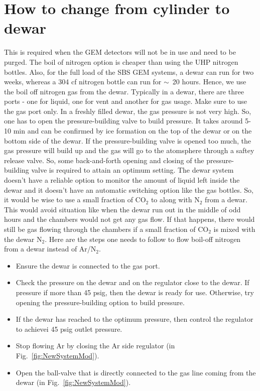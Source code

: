 \section{How to change from cylinder to dewar}
\label{bottlechange}
This is required when the GEM detectors will not be in use and need to be purged.
 The boil of nitrogen option is cheaper than using the UHP nitrogen bottles. 
Also, for the full load of the SBS GEM systems, a dewar can run for two weeks, 
whereas a 304 cf nitrogen bottle can run for $\sim$~20 hours. 
Hence, we use the boil off nitrogen gas from the dewar. Typically in a dewar, there are three ports - one for liquid, one for vent and another for gas usage. Make sure to use the gas port only.
In a freshly filled dewar, the gas pressure is not very high. 
So, one has to open the pressure-building valve to build pressure. 
It takes around 5-10 min and can be confirmed by ice formation on the top of the dewar
 or on the bottom side of the dewar. If the pressure-building valve is opened too much,
 the gas pressure will build up and the gas will go to the atomsphere through a saftey release valve.
So, some back-and-forth opening and closing of the pressure-building valve is required to attain an optimum
setting. The dewar system doesn't have a reliable option to monitor the amount of liquid left
 inside the dewar and it doesn't have an automatic switching option like the gas bottles. 
So, it would be wise to use a small fraction of CO$_2$ to along with N$_2$ from a dewar. 
This would avoid situation like when the dewar run out in the middle of odd hours and the chambers would not get any gas flow.
 If that happens, there would still be gas flowing through the chambers if a small fraction of CO$_2$ is mixed with the dewar N$_2$.
Here are the steps one needs to follow to flow boil-off nitrogen from a dewar instead of Ar/N$_2$. 
\begin{itemize}
\item Ensure the dewar is connected to the gas port.
\item Check the pressure on the dewar and on the regulator close to the dewar. 
If pressure if more than 45 psig, then the dewar is ready for use. Otherwise, try opening the pressure-building option to build pressure.
\item If the dewar has reached to the optimum pressure, then control the regulator to achievei 45 psig outlet pressure.
\item Stop flowing Ar by closing the Ar side regulator (in Fig.~\ref{fig:NewSystemMod}).
\item Open the ball-valve that is directly connected to the gas line coming from the dewar (in Fig.~\ref{fig:NewSystemMod}).   
\end{itemize}

